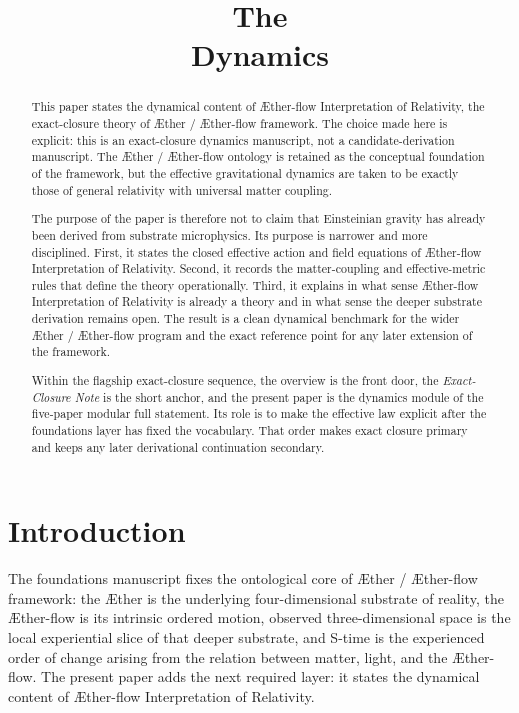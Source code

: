 \documentclass[11pt]{article}
\title{\textbf{The \TheoryName{}}\\[0.4em]
\large Dynamics}
\author{}
\date{}
\newcommand{\Aether}{\AE{}ther}
\newcommand{\Aflow}{\AE{}ther-flow}
\newcommand{\TheoryName}{\Aflow{} Interpretation of Relativity}
\newcommand{\TheoryProgram}{\Aether{} / \Aflow{} framework}
\begin{document}
\maketitle

\begin{abstract}
This paper states the dynamical content of \TheoryName{}, the exact-closure theory of \TheoryProgram{}. The choice made here is explicit: this is an exact-closure dynamics manuscript, not a candidate-derivation manuscript. The \Aether{} / \Aflow{} ontology is retained as the conceptual foundation of the framework, but the effective gravitational dynamics are taken to be exactly those of general relativity with universal matter coupling.

The purpose of the paper is therefore not to claim that Einsteinian gravity has already been derived from substrate microphysics. Its purpose is narrower and more disciplined. First, it states the closed effective action and field equations of \TheoryName{}. Second, it records the matter-coupling and effective-metric rules that define the theory operationally. Third, it explains in what sense \TheoryName{} is already a theory and in what sense the deeper substrate derivation remains open. The result is a clean dynamical benchmark for the wider \Aether{} / \Aflow{} program and the exact reference point for any later extension of the framework.

Within the flagship exact-closure sequence, the overview is the front door, the \emph{Exact-Closure Note} is the short anchor, and the present paper is the dynamics module of the five-paper modular full statement. Its role is to make the effective law explicit after the foundations layer has fixed the vocabulary. That order makes exact closure primary and keeps any later derivational continuation secondary.
\end{abstract}

\section{Introduction}

The foundations manuscript fixes the ontological core of \TheoryProgram{}: the \Aether{} is the underlying four-dimensional substrate of reality, the \Aflow{} is its intrinsic ordered motion, observed three-dimensional space is the local experiential slice of that deeper substrate, and S-time is the experienced order of change arising from the relation between matter, light, and the \Aflow{}. The present paper adds the next required layer: it states the dynamical content of \TheoryName{}.
\end{document}
